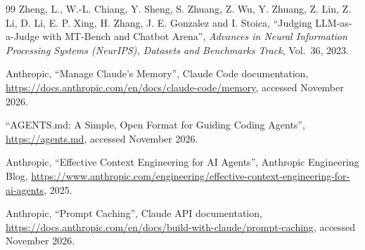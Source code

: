 \begin{thebibliography}{99}
 Zheng, L., W.-L. Chiang, Y. Sheng, S. Zhuang, Z. Wu, Y. Zhuang, Z. Lin, Z. Li, D. Li, E. P. Xing, H. Zhang, J. E. Gonzalez and I. Stoica, ``Judging LLM-as-a-Judge with MT-Bench and Chatbot Arena'', \emph{Advances in Neural Information Processing Systems (NeurIPS), Datasets and Benchmarks Track}, Vol.~36, 2023.

 Anthropic, ``Manage Claude's Memory'', Claude Code documentation, \url{https://docs.anthropic.com/en/docs/claude-code/memory}, accessed November 2026.

 ``AGENTS.md: A Simple, Open Format for Guiding Coding Agents'', \url{https://agents.md}, accessed November 2026.

 Anthropic, ``Effective Context Engineering for AI Agents'', Anthropic Engineering Blog, \url{https://www.anthropic.com/engineering/effective-context-engineering-for-ai-agents}, 2025.

 Anthropic, ``Prompt Caching'', Claude API documentation, \url{https://docs.anthropic.com/en/docs/build-with-claude/prompt-caching}, accessed November 2026.

\end{thebibliography}
